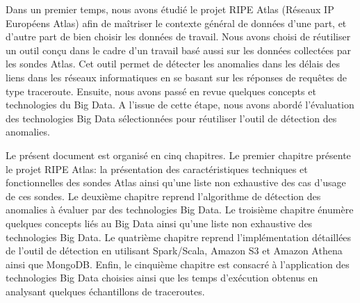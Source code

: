 
Dans un premier temps, nous avons étudié le projet RIPE  Atlas (Réseaux IP Européens Atlas) afin de maîtriser le contexte général de données  d'une part, et d'autre part de bien choisir les données de travail. Nous avons choisi de réutiliser un outil conçu dans le cadre d'un travail basé aussi sur les données collectées par les sondes Atlas. Cet outil permet de détecter les anomalies dans les délais des liens dans les réseaux informatiques en se basant sur les réponses de requêtes de type traceroute. 
 Ensuite, nous avons passé en revue quelques concepts  et   technologies du Big Data.
  A l'issue de cette étape, nous avons abordé l'évaluation des technologies Big Data sélectionnées pour
    réutiliser l'outil de  détection des anomalies.



Le présent document est organisé en cinq chapitres. Le premier chapitre présente le projet RIPE Atlas: la présentation des caractéristiques techniques et fonctionnelles des sondes Atlas ainsi qu'une liste non exhaustive des cas d'usage de ces sondes. Le deuxième chapitre reprend l'algorithme de  détection des anomalies  à évaluer par des technologies Big Data.
Le troisième chapitre énumère quelques concepts liés au Big Data ainsi qu'une liste non exhaustive des technologies Big Data.
Le quatrième chapitre reprend l'implémentation détaillées de l'outil de détection en utilisant  Spark/Scala, Amazon S3 et Amazon Athena ainsi que MongoDB. Enfin, le cinquième  chapitre est consacré à l'application des technologies Big Data  choisies
ainsi que les temps d'exécution obtenus en analysant quelques échantillons de traceroutes.


